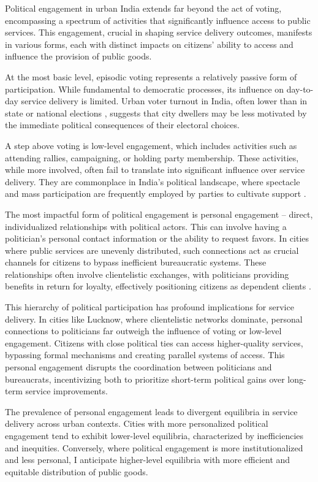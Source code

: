 Political engagement in urban India extends far beyond the act of voting, encompassing a spectrum of activities that significantly influence access to public services. This engagement, crucial in shaping service delivery outcomes, manifests in various forms, each with distinct impacts on citizens' ability to access and influence the provision of public goods.

At the most basic level, episodic voting represents a relatively passive form of participation. While fundamental to democratic processes, its influence on day-to-day service delivery is limited. Urban voter turnout in India, often lower than in state or national elections \citep{joshi_urban_2016}, suggests that city dwellers may be less motivated by the immediate political consequences of their electoral choices.

A step above voting is low-level engagement, which includes activities such as attending rallies, campaigning, or holding party membership. These activities, while more involved, often fail to translate into significant influence over service delivery. They are commonplace in India's political landscape, where spectacle and mass participation are frequently employed by parties to cultivate support \citep{sheikh_electoral_2018}.

The most impactful form of political engagement is personal engagement – direct, individualized relationships with political actors. This can involve having a politician's personal contact information or the ability to request favors. In cities where public services are unevenly distributed, such connections act as crucial channels for citizens to bypass inefficient bureaucratic systems. These relationships often involve clientelistic exchanges, with politicians providing benefits in return for loyalty, effectively positioning citizens as dependent clients \citep{auyero_logic_2000}.

This hierarchy of political participation has profound implications for service delivery. In cities like Lucknow, where clientelistic networks dominate, personal connections to politicians far outweigh the influence of voting or low-level engagement. Citizens with close political ties can access higher-quality services, bypassing formal mechanisms and creating parallel systems of access. This personal engagement disrupts the coordination between politicians and bureaucrats, incentivizing both to prioritize short-term political gains over long-term service improvements.

The prevalence of personal engagement leads to divergent equilibria in service delivery across urban contexts. Cities with more personalized political engagement tend to exhibit lower-level equilibria, characterized by inefficiencies and inequities. Conversely, where political engagement is more institutionalized and less personal, I anticipate higher-level equilibria with more efficient and equitable distribution of public goods.

